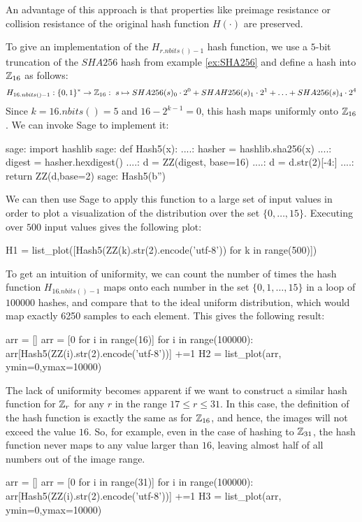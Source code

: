 An advantage of this approach is that properties like preimage resistance or collision resistance of the original hash function $H(\cdot)$ are preserved.
\begin{example} To give an implementation of the $H_{r.nbits()-1}$ hash function, we use a $5$-bit truncation of the $SHA256$ hash from example \ref{ex:SHA256} and define a hash into $\mathbb{Z}_{16}$ as follows:
$$
H_{16.nbits()-1}: \{0,1\}^* \to \mathbb{Z}_{16}:\; s\mapsto
SHA256(s)_0\cdot 2^0 + SHAH256(s)_1\cdot 2^1 + \ldots + SHA256(s)_4\cdot 2^4
$$
Since $k=16.nbits()=5$ and $16-2^{k-1}=0$, this hash maps uniformly onto $\mathbb{Z}_{16}$. We can invoke Sage to implement it:
\begin{sagecommandline}
sage: import hashlib
sage: def Hash5(x):
....:     hasher = hashlib.sha256(x)
....:     digest = hasher.hexdigest()
....:     d = ZZ(digest, base=16)
....:     d = d.str(2)[-4:]
....:     return ZZ(d,base=2)
sage: Hash5(b'')
\end{sagecommandline}
We can then use Sage to apply this function to a large set of input values in order to plot a visualization of the distribution over the set $\{0,\ldots,15\}$. Executing over $500$ input values gives the following plot:
\begin{sagesilent}
H1 = list_plot([Hash5(ZZ(k).str(2).encode('utf-8')) for k in range(500)])
\end{sagesilent}
\begin{center}
\end{center}
To get an intuition of uniformity, we can count the number of times the hash function $H_{16.nbits()-1}$ maps onto each number in the set $\{0,1,\ldots,15\}$ in a loop of $100000$ hashes, and compare that to the ideal uniform distribution, which would map exactly 6250 samples to each element. This gives the following result:
\begin{sagesilent}
arr = []
arr = [0 for i in range(16)]
for i in range(100000):
    arr[Hash5(ZZ(i).str(2).encode('utf-8'))] +=1
H2 = list_plot(arr, ymin=0,ymax=10000)
\end{sagesilent}
\begin{center}
\end{center}
The lack of uniformity becomes apparent if we want to construct a similar hash function for $\mathbb{Z}_r$ for any $r$ in the range $17\leq r \leq 31$. In this case, the definition of the hash function is exactly the same as for $\mathbb{Z}_{16}$, and hence, the images will not exceed the value $16$. So, for example, even in the case of hashing to $\mathbb{Z}_{31}$, the hash function never maps to any value larger than $16$, leaving almost half of all numbers out of the image range.
\begin{sagesilent}
arr = []
arr = [0 for i in range(31)]
for i in range(100000):
    arr[Hash5(ZZ(i).str(2).encode('utf-8'))] +=1
H3 = list_plot(arr, ymin=0,ymax=10000)
\end{sagesilent}
\begin{center}
\end{center}
\end{example}

